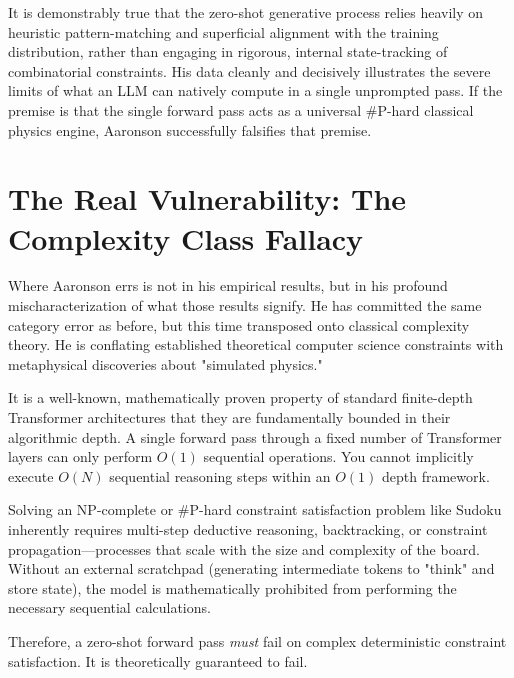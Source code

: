 \documentclass[12pt,a4paper]{article}
\begin{document}
It is demonstrably true that the zero-shot generative process relies heavily on heuristic pattern-matching and superficial alignment with the training distribution, rather than engaging in rigorous, internal state-tracking of combinatorial constraints. His data cleanly and decisively illustrates the severe limits of what an LLM can natively compute in a single unprompted pass. If the premise is that the single forward pass acts as a universal \#P-hard classical physics engine, Aaronson successfully falsifies that premise.

\section{The Real Vulnerability: The Complexity Class Fallacy}

Where Aaronson errs is not in his empirical results, but in his profound mischaracterization of what those results signify. He has committed the same category error as before, but this time transposed onto classical complexity theory. He is conflating established theoretical computer science constraints with metaphysical discoveries about "simulated physics." 

It is a well-known, mathematically proven property of standard finite-depth Transformer architectures that they are fundamentally bounded in their algorithmic depth. A single forward pass through a fixed number of Transformer layers can only perform $O(1)$ sequential operations. You cannot implicitly execute $O(N)$ sequential reasoning steps within an $O(1)$ depth framework.

Solving an NP-complete or \#P-hard constraint satisfaction problem like Sudoku inherently requires multi-step deductive reasoning, backtracking, or constraint propagation---processes that scale with the size and complexity of the board. Without an external scratchpad (generating intermediate tokens to "think" and store state), the model is mathematically prohibited from performing the necessary sequential calculations.

Therefore, a zero-shot forward pass \emph{must} fail on complex deterministic constraint satisfaction. It is theoretically guaranteed to fail.
\end{document}
